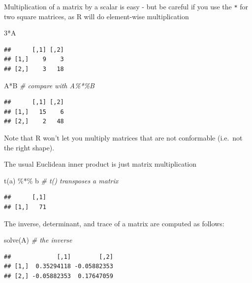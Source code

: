 \documentclass[
]{book}
\newenvironment{Shaded}{\begin{snugshade}}{\end{snugshade}}
\newcommand{\CommentTok}[1]{\textcolor[rgb]{0.56,0.35,0.01}{\textit{#1}}}
\newcommand{\DecValTok}[1]{\textcolor[rgb]{0.00,0.00,0.81}{#1}}
\newcommand{\FunctionTok}[1]{\textcolor[rgb]{0.00,0.00,0.00}{#1}}
\newcommand{\NormalTok}[1]{#1}
\newcommand{\SpecialCharTok}[1]{\textcolor[rgb]{0.00,0.00,0.00}{#1}}
\theoremstyle{definition}
\theoremstyle{definition}
\theoremstyle{definition}
\theoremstyle{definition}
\theoremstyle{remark}
\begin{document}
Multiplication of a matrix by a scalar is easy - but be careful if you use the \texttt{*} for two square matrices, as R will do element-wise multiplication

\begin{Shaded}
\begin{Highlighting}[]
\DecValTok{3}\SpecialCharTok{*}\NormalTok{A}
\end{Highlighting}
\end{Shaded}

\begin{verbatim}
##      [,1] [,2]
## [1,]    9    3
## [2,]    3   18
\end{verbatim}

\begin{Shaded}
\begin{Highlighting}[]
\NormalTok{A}\SpecialCharTok{*}\NormalTok{B }\CommentTok{\# compare with A\%*\%B}
\end{Highlighting}
\end{Shaded}

\begin{verbatim}
##      [,1] [,2]
## [1,]   15    6
## [2,]    2   48
\end{verbatim}

Note that R won't let you multiply matrices that are not conformable (i.e.~not the right shape).

The usual Euclidean inner product is just matrix multiplication

\begin{Shaded}
\begin{Highlighting}[]
\FunctionTok{t}\NormalTok{(a) }\SpecialCharTok{\%*\%}\NormalTok{ b  }\CommentTok{\# t() transposes a matrix}
\end{Highlighting}
\end{Shaded}

\begin{verbatim}
##      [,1]
## [1,]   71
\end{verbatim}

The inverse, determinant, and trace of a matrix are computed as follows:

\begin{Shaded}
\begin{Highlighting}[]
\FunctionTok{solve}\NormalTok{(A) }\CommentTok{\# the inverse}
\end{Highlighting}
\end{Shaded}

\begin{verbatim}
##             [,1]        [,2]
## [1,]  0.35294118 -0.05882353
## [2,] -0.05882353  0.17647059
\end{verbatim}
\end{document}
